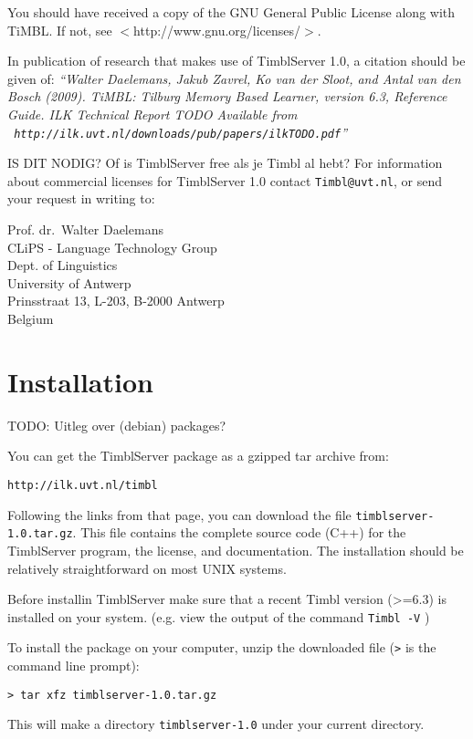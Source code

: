 \documentclass{report}
\begin{document}
You should have received a copy of the GNU General Public License along with TiMBL.  If not, see $<$http://www.gnu.org/licenses/$>$.

In publication of research that makes use of TimblServer 1.0, a citation should be given of: {\em ``Walter Daelemans, Jakub Zavrel, Ko van der
  Sloot, and Antal van den Bosch (2009). TiMBL: Tilburg Memory Based
  Learner, version 6.3, Reference Guide. ILK Technical Report TODO
  Available from \\ {\tt
    http://ilk.uvt.nl/downloads/pub/papers/ilkTODO.pdf}''}

IS DIT NODIG?
Of is TimblServer free als je Timbl al hebt?
For information about commercial licenses for TimblServer 1.0
contact {\tt Timbl@uvt.nl}, or send your request in writing to:

Prof. dr.~Walter Daelemans\\
CLiPS - Language Technology Group\\
Dept. of Linguistics \\
University of Antwerp\\
Prinsstraat 13, L-203, B-2000 Antwerp \\
Belgium

\pagestyle{headings}

\chapter{Installation}

TODO: Uitleg over (debian) packages?

\vspace{-1cm}
You can get the TimblServer package as a gzipped tar archive from:

{\tt http://ilk.uvt.nl/timbl}

Following the links from that page, you can download the file {\tt timblserver-1.0.tar.gz}. This file contains the complete source code (C++) for the TimblServer program, the license, and documentation. The installation should be relatively straightforward on most UNIX systems.

Before installin TimblServer make sure that a recent Timbl version (>=6.3) is installed on your system. (e.g. view the output of the command {\tt Timbl -V} )

To install the package on your computer, unzip the downloaded file ({\tt >} is the command line prompt):

{\tt > tar xfz timblserver-1.0.tar.gz}

This will make a directory {\tt timblserver-1.0} under your current directory.
\end{document}

